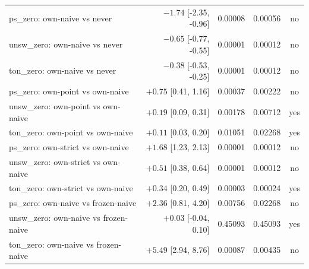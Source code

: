 \begin{table}
\begin{tabular}{l r r r c}
ps\_zero: own-naive vs never & $-1.74$ [-2.35, -0.96] & 0.00008 & 0.00056 & no \\
unsw\_zero: own-naive vs never & $-0.65$ [-0.77, -0.55] & 0.00001 & 0.00012 & no \\
ton\_zero: own-naive vs never & $-0.38$ [-0.53, -0.25] & 0.00001 & 0.00012 & no \\
ps\_zero: own-point vs own-naive & $+0.75$ [0.41, 1.16] & 0.00037 & 0.00222 & no \\
unsw\_zero: own-point vs own-naive & $+0.19$ [0.09, 0.31] & 0.00178 & 0.00712 & yes \\
ton\_zero: own-point vs own-naive & $+0.11$ [0.03, 0.20] & 0.01051 & 0.02268 & yes \\
ps\_zero: own-strict vs own-naive & $+1.68$ [1.23, 2.13] & 0.00001 & 0.00012 & no \\
unsw\_zero: own-strict vs own-naive & $+0.51$ [0.38, 0.64] & 0.00001 & 0.00012 & no \\
ton\_zero: own-strict vs own-naive & $+0.34$ [0.20, 0.49] & 0.00003 & 0.00024 & yes \\
ps\_zero: own-naive vs frozen-naive & $+2.36$ [0.81, 4.20] & 0.00756 & 0.02268 & no \\
unsw\_zero: own-naive vs frozen-naive & $+0.03$ [-0.04, 0.10] & 0.45093 & 0.45093 & yes \\
ton\_zero: own-naive vs frozen-naive & $+5.49$ [2.94, 8.76] & 0.00087 & 0.00435 & no \\
\bottomrule
\end{tabular}
\end{table}
